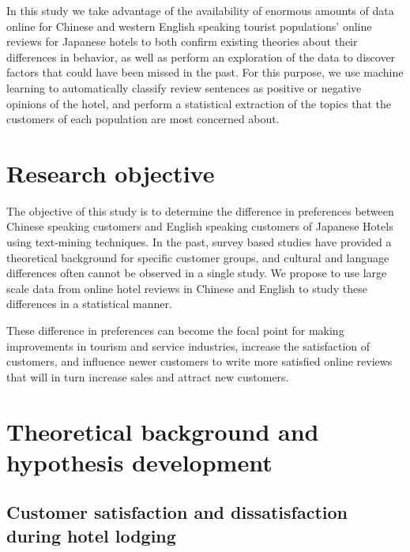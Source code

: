 \documentclass[review]{elsarticle}
\begin{document}
In this study we take advantage of the availability of enormous amounts of data online for Chinese and western English speaking tourist populations' online reviews for Japanese hotels to both confirm existing theories about their differences in behavior, as well as perform an exploration of the data to discover factors that could have been missed in the past. For this purpose, we use machine learning to automatically classify review sentences as positive or negative opinions of the hotel, and perform a statistical extraction of the topics that the customers of each population are most concerned about.


\section{Research objective}\label{research_objective}

The objective of this study is to determine the difference in preferences between Chinese speaking customers and English speaking customers of Japanese Hotels using text-mining techniques. In the past, survey based studies have provided a theoretical background for specific customer groups, and cultural and language differences often cannot be observed in a single study. We propose to use large scale data from online hotel reviews in Chinese and English to study these differences in a statistical manner.

These difference in preferences can become the focal point for making improvements in tourism and service industries, increase the satisfaction of customers, and influence newer customers to write more satisfied online reviews that will in turn increase sales and attract new customers.

\section{Theoretical background and hypothesis development}\label{theory_hypothesis}

\subsection{Customer satisfaction and dissatisfaction during hotel lodging}\label{theory_satisfaction}
\end{document}
